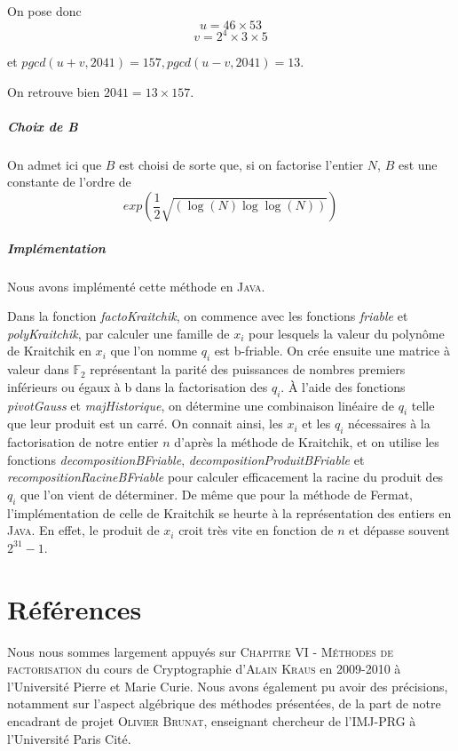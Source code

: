 \documentclass[11pt,a4paper]{article}
\begin{document}
 	On pose donc 
 	$$ u = 46 \times 53 $$ 
 	$$ v = 2^4 \times 3 \times 5$$
 	
 	et $pgcd(u+v, 2041) = 157, pgcd(u-v, 2041) = 13$.
 	
 	On retrouve bien $2041 = 13 \times 157$.
 	
 	
 	\subparagraph{Choix de B}
	
	On admet ici que $B$ est choisi de sorte que, si on factorise l'entier $N$, $B$ est une constante de l'ordre de 
	$$exp(\frac{1}{2} \sqrt{(\log(N) \log\log(N))})$$
		
	\subparagraph{Implémentation}
	Nous avons implémenté cette méthode en \textsc{Java}.

	Dans la fonction \textit{factoKraitchik}, on commence avec les fonctions \textit{friable} et \textit{polyKraitchik}, par calculer une famille de $x_i$ pour lesquels la valeur du polynôme de Kraitchik en $x_i$ que l'on nomme $q_i$ est b-friable. On crée ensuite une matrice à valeur dans $\mathbb{F}_2$ représentant la parité des puissances de nombres premiers inférieurs ou égaux à b dans la factorisation des $q_i$. À l'aide des fonctions \textit{pivotGauss} et \textit{majHistorique}, on détermine une combinaison linéaire de $q_i$ telle que leur produit est un carré. On connait ainsi, les $x_i$ et les $q_i$ nécessaires à la factorisation de notre entier $n$ d'après la méthode de Kraitchik, et on utilise les fonctions \textit{decompositionBFriable}, \textit{decompositionProduitBFriable} et \textit{recompositionRacineBFriable} pour calculer efficacement la racine du produit des $q_i$ que l'on vient de déterminer. De même que pour la méthode de Fermat, l'implémentation de celle de Kraitchik se heurte à la représentation des entiers en \textsc{Java}. En effet, le produit de $x_i$ croit très vite en fonction de $n$ et dépasse souvent $2^{31} - 1$.
	
	
	\newpage
	\section{\LARGE{Références}}
	Nous nous sommes largement appuyés sur \textsc{Chapitre VI - Méthodes de factorisation} du cours de Cryptographie d'\textsc{Alain Kraus} en 2009-2010 à l'Université Pierre et Marie Curie. Nous avons également pu avoir des précisions, notamment sur l'aspect algébrique des méthodes présentées, de la part de notre encadrant de projet \textsc{Olivier Brunat}, enseignant chercheur de l'IMJ-PRG à l'Université Paris Cité.
	
\end{document}
